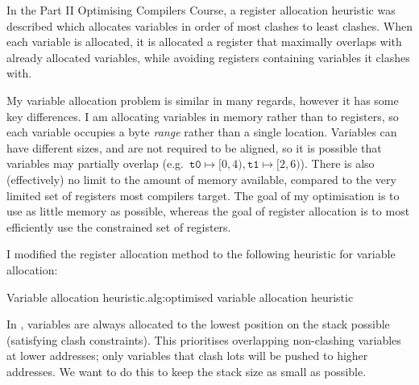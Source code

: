 \documentclass[00-main.tex]{subfiles}
\begin{document}
In the Part II Optimising Compilers Course, a register allocation heuristic was described which allocates variables in order of most clashes to least clashes.
When each variable is allocated, it is allocated a register that maximally overlaps with already allocated variables, while avoiding registers containing variables it clashes with.

My variable allocation problem is similar in many regards, however it has some key differences.
I am allocating variables in memory rather than to registers, so each variable occupies a byte \emph{range} rather than a single location.
Variables can have different sizes, and are not required to be aligned, so it is possible that variables may partially overlap (e.g.~$\texttt{t0} \mapsto [0, 4), \texttt{t1} \mapsto [2, 6)$). %
There is also (effectively) no limit to the amount of memory available, compared to the very limited set of registers most compilers target.
The goal of my optimisation is to use as little memory as possible, whereas the goal of register allocation is to most efficiently use the constrained set of registers.

I modified the register allocation method to the following heuristic for variable allocation:

\begin{Algorithm}{Variable allocation heuristic.}{alg:optimised variable allocation heuristic}
\end{Algorithm}

In , variables are always allocated to the lowest position on the stack possible (satisfying clash constraints).
This prioritises overlapping non-clashing variables at lower addresses; only variables that clash lots will be pushed to higher addresses.
We want to do this to keep the stack size as small as possible.
\end{document}
